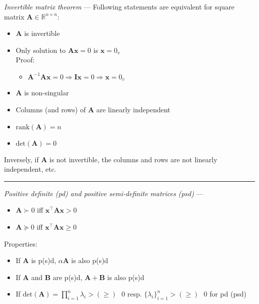 \emph{Invertible matrix theorem} --- Following statements are equivalent for square matrix $\boldsymbol{A} \in \mathbb{R}^{n \times n}$: 
\begin{itemize}
    \item $\boldsymbol{A}$ is invertible
    \item Only solution to $\boldsymbol{A}\boldsymbol{x} = 0$ is $\boldsymbol{x} = 0_v$\\
    Proof:
    \begin{itemize}
        \item $\boldsymbol{A}^{-1} \boldsymbol{A} \boldsymbol{x} = 0 \Rightarrow \boldsymbol{I} \boldsymbol{x} = 0 \Rightarrow \boldsymbol{x} = 0_v$
    \end{itemize}
    \item $\boldsymbol{A}$ is non-singular
    \item Columns (and rows) of $\boldsymbol{A}$ are linearly independent
    \item $\textrm{rank}(\boldsymbol{A}) = n$
    \item $\textrm{det}(\boldsymbol{A}) = 0$
\end{itemize}
Inversely, if $\boldsymbol{A}$ is not invertible, the columns and rows are not linearly independent, etc. 

{\color{lightgray}\hrule height 0.001mm}

\emph{Positive definite (pd) and positive semi-definite matrices (psd)} --- 
\begin{multicols}{2}
\begin{itemize}
    \item $\boldsymbol{A} \succ 0$ iff $\boldsymbol{x}^\intercal\boldsymbol{A}\boldsymbol{x} > 0$
    \item $\boldsymbol{A} \succeq 0$ iff $\boldsymbol{x}^\intercal\boldsymbol{A}\boldsymbol{x} \geq 0$
\end{itemize}
\end{multicols}
Properties:
\begin{itemize}
    \item If $\boldsymbol{A}$ is p(s)d, $\alpha\boldsymbol{A}$ is also p(s)d
    \item If $\boldsymbol{A}$ and $\boldsymbol{B}$ are p(s)d, $\boldsymbol{A} + \boldsymbol{B}$ is also p(s)d
    \item If $\textrm{det}(\boldsymbol{A}) = \prod_{i=1}^n \lambda_i > (\geq) \textrm{ } 0$ resp. $\{\lambda_i\}_{i=1}^n > (\geq) \textrm{ } 0$ for pd (psd)
\end{itemize}

